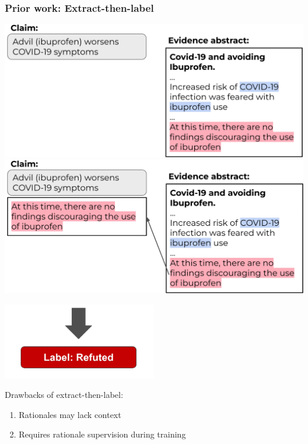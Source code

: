 \documentclass[13.5pt,aspecratio=169, xcolor=dvipsnames]{beamer}
\begin{document}
    \begin{frame}
    \onehalfspacing
        \frametitle{Prior work: Extract-then-label}
         {
            \includegraphics[width=\textwidth]{Extract_then_label_1.png}
        }
         {
            \includegraphics[width=\textwidth]{Extract_then_label_2.png}
        }

         {
            \vspace*{-7em}
            \includegraphics[width=0.5\textwidth]{produce_label.png}
        }

         {
            \begin{overlayarea}{\textwidth}{\textheight}
                \vspace*{-3.5em}
                \hspace*{17em}
                \begin{minipage}{0.45\textwidth}
                    \begin{block}{Drawbacks of extract-then-label:}
                        \begin{enumerate}
                            \item Rationales may lack context
                            \item Requires rationale supervision during training
                        \end{enumerate}
                    \end{block}
                \end{minipage}
            \end{overlayarea}
        }
    \end{frame}
    
\end{document}
